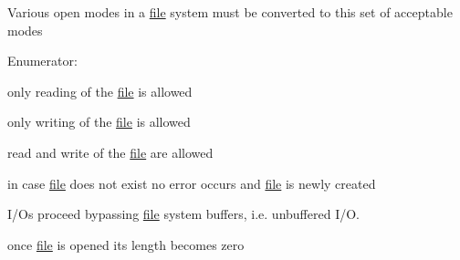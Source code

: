 Various open modes in a \hyperlink{classfile}{file} system must be converted to this set of acceptable modes \begin{Desc}
\item[Enumerator: ]\par
\begin{description}
\item[{\em 
\hypertarget{group__iolayer_gge71b15e0014e7ce4dc13c8f83aa97582ac58f1566e053cf5f8ee9dcb5f97b82b}{
RDONLY}
\label{group__iolayer_gge71b15e0014e7ce4dc13c8f83aa97582ac58f1566e053cf5f8ee9dcb5f97b82b}
}]only reading of the \hyperlink{classfile}{file} is allowed \item[{\em 
\hypertarget{group__iolayer_gge71b15e0014e7ce4dc13c8f83aa97582de40e8cbe66eb259ed5378c7d13b4f69}{
WRONLY}
\label{group__iolayer_gge71b15e0014e7ce4dc13c8f83aa97582de40e8cbe66eb259ed5378c7d13b4f69}
}]only writing of the \hyperlink{classfile}{file} is allowed \item[{\em 
\hypertarget{group__iolayer_gge71b15e0014e7ce4dc13c8f83aa97582afcab766b3f436a66049b850ef7efb5c}{
RDWR}
\label{group__iolayer_gge71b15e0014e7ce4dc13c8f83aa97582afcab766b3f436a66049b850ef7efb5c}
}]read and write of the \hyperlink{classfile}{file} are allowed \item[{\em 
\hypertarget{group__iolayer_gge71b15e0014e7ce4dc13c8f83aa97582971314bb8ab4fa48a078a4164c704edd}{
CREAT}
\label{group__iolayer_gge71b15e0014e7ce4dc13c8f83aa97582971314bb8ab4fa48a078a4164c704edd}
}]in case \hyperlink{classfile}{file} does not exist no error occurs and \hyperlink{classfile}{file} is newly created \item[{\em 
\hypertarget{group__iolayer_gge71b15e0014e7ce4dc13c8f83aa97582e1e222042131ddbb85b2bd3fc0f80653}{
DIRECT}
\label{group__iolayer_gge71b15e0014e7ce4dc13c8f83aa97582e1e222042131ddbb85b2bd3fc0f80653}
}]I/Os proceed bypassing \hyperlink{classfile}{file} system buffers, i.e. unbuffered I/O. \item[{\em 
\hypertarget{group__iolayer_gge71b15e0014e7ce4dc13c8f83aa975828842a94419a50b809fdead40a130785d}{
TRUNC}
\label{group__iolayer_gge71b15e0014e7ce4dc13c8f83aa975828842a94419a50b809fdead40a130785d}
}]once \hyperlink{classfile}{file} is opened its length becomes zero \end{description}
\end{Desc}



